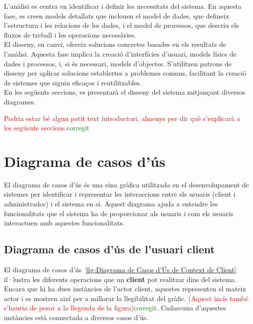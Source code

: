 \documentclass[a4paper,12pt,twoside]{ThesisStyle}
\newcommand{\pau}[1]{\textcolor{red}{#1}}
\newcommand{\sudan}[1]{\textcolor{green}{#1}}
\begin{document}
L'anàlisi es centra en identificar i definir les necessitats del sistema. En aquesta fase, es creen models detallats que inclouen el model de dades, que defineix l'estructura i les relacions de les dades, i el model de processos, que descriu els fluxos de treball i les operacions necessàries.\\

El disseny, en canvi, ofereix solucions concretes basades en els resultats de l'anàlisi. Aquesta fase implica la creació d'interfícies d'usuari, models físics de dades i processos, i, si és necessari, models d'objectes. S'utilitzen patrons de disseny per aplicar solucions establertes a problemes comuns, facilitant la creació de sistemes que siguin eficaços i reutilitzables.\\

En les següents seccions, es presentarà el disseny del sistema mitjançant diversos diagrames.


\pau{Podria estar bé algun petit text introductori, almenys per dir què s'explicarà a les següents seccions.}\sudan{corregit}


\section{Diagrama de casos d'ús}
\label{sec: Diagrama de casos d'ús}

El diagrama de casos d'ús és una eina gràfica utilitzada en el desenvolupament de sistemes per identificar i representar les interaccions entre els usuaris (client i administrador) i el sistema en si. Aquest diagrama ajuda a entendre les funcionalitats que el sistema ha de proporcionar als usuaris i com els usuaris interactuen amb aquestes funcionalitats.


\subsection{Diagrama de casos d'ús de l'usuari client}
\label{subsec: Diagrama de casos d'ús de l'usuari client}

El diagrama de casos d'ús~\ref{fig:Diagrama de Casos d'Ús de Context de Client} il·lustra les diferents operacions que un \textbf{client} pot realitzar dins del sistema. Encara que hi ha dues instàncies de l'actor client, aquestes representen el mateix actor i es mostren així per a millorar la llegibilitat del gràfic. \pau{(Aquest incís també s'hauria de posar a la llegenda de la figura)\sudan{corregit}.} Cadascuna d'aquestes instàncies està connectada a diversos casos d'ús.
\end{document}
